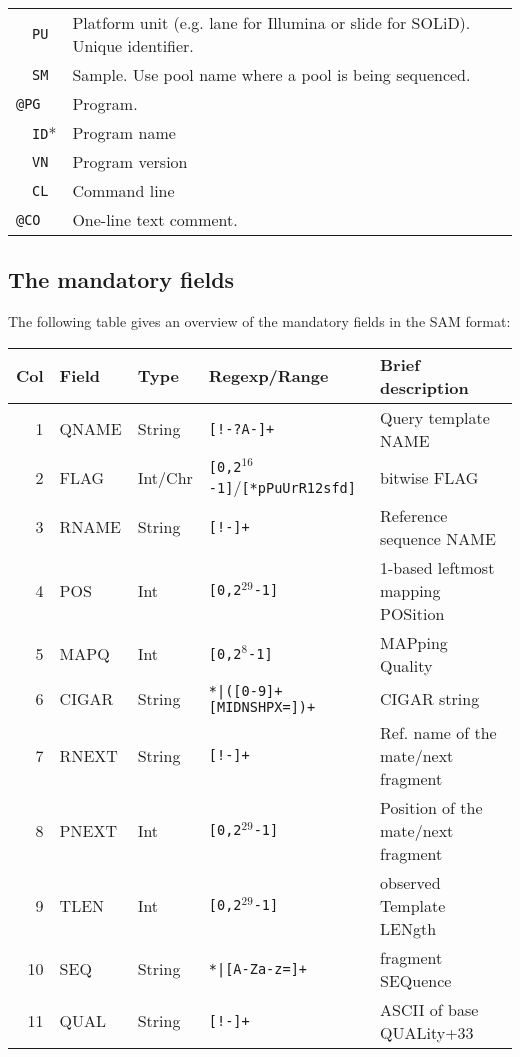 \documentclass[10pt]{article}
\begin{document}
\begin{center}
\begin{tabular}{|l|l|p{13.5cm}|}
  & {\tt PU} & Platform unit (e.g. lane for Illumina or slide for SOLiD). Unique identifier.\\\cline{2-3}
  & {\tt SM} & Sample. Use pool name where a pool is being sequenced.\\\hline
  \multicolumn{2}{|l}{\tt @PG} & Program. \\\cline{2-3}
  & {\tt ID}* & Program name \\\cline{2-3}
  & {\tt VN} & Program version \\\cline{2-3}
  & {\tt CL} & Command line \\\hline
  \multicolumn{2}{|l}{\tt @CO} & One-line text comment.\\
  \hline
\end{tabular}
\end{center}

\subsection{The mandatory fields}
The following table gives an overview of the mandatory fields in
the SAM format:
\begin{center}
\begin{tabular}{rllll}
  \hline
  {\bf Col} & {\bf Field} & {\bf Type} & {\bf Regexp/Range} & {\bf Brief description} \\
  \hline
  1 & {\sf QNAME} & String & {\tt [!-?A-\char126]+} & Query template NAME\\
  2 & {\sf FLAG} & Int/Chr & {\tt [0,2$^{16}$-1]}/{\tt [*pPuUrR12sfd]} & bitwise FLAG \\
  3 & {\sf RNAME} & String & {\tt [!-\char126]+} & Reference sequence NAME\\
  4 & {\sf POS} & Int & {\tt [0,2$^{29}$-1]} & 1-based leftmost mapping POSition \\
  5 & {\sf MAPQ} & Int & {\tt [0,2$^8$-1]} & MAPping Quality \\
  6 & {\sf CIGAR} & String & {\tt \char92*|([0-9]+[MIDNSHPX=])+} & CIGAR string \\
  7 & {\sf RNEXT} & String & {\tt [!-\char126]+} & Ref. name of the mate/next fragment\\
  8 & {\sf PNEXT} & Int & {\tt [0,2$^{29}$-1]} & Position of the mate/next fragment \\
  9 & {\sf TLEN} & Int & {\tt [0,2$^{29}$-1]} & observed Template LENgth \\
  10 & {\sf SEQ} & String & {\tt \char92*|[A-Za-z=]+} & fragment SEQuence\\
  11 & {\sf QUAL} & String & {\tt [!-\char126]+} & ASCII of base QUALity+33 \\
  \hline
\end{tabular}
\end{center}
\end{document}
